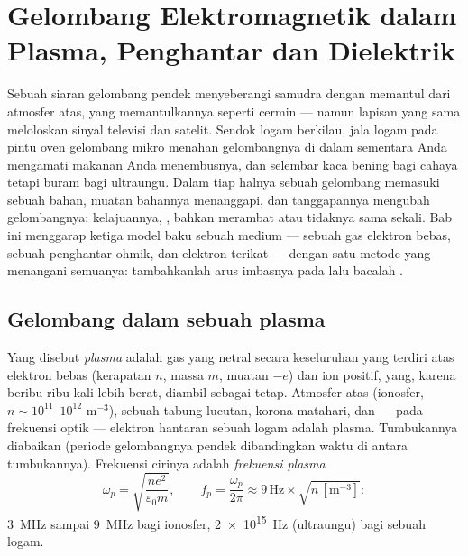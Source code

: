 \chapter{Gelombang Elektromagnetik dalam Plasma, Penghantar dan Dielektrik}\label{ch:b2:waves-in-media}

Sebuah siaran gelombang pendek menyeberangi samudra dengan memantul dari
atmosfer atas, yang memantulkannya seperti cermin --- namun lapisan yang sama
meloloskan sinyal televisi dan satelit. Sendok logam berkilau, jala
logam pada pintu oven gelombang mikro menahan gelombangnya di dalam sementara
Anda mengamati makanan Anda menembusnya, dan selembar kaca bening
bagi cahaya tetapi buram bagi ultraungu. Dalam tiap halnya sebuah gelombang memasuki
sebuah bahan, muatan bahannya menanggapi, dan tanggapannya mengubah
gelombangnya: kelajuannya, , bahkan merambat atau tidaknya
sama sekali. Bab ini menggarap ketiga model baku sebuah medium --- sebuah
gas elektron bebas, sebuah penghantar ohmik, dan elektron terikat --- dengan
satu metode yang menangani semuanya: tambahkanlah arus imbasnya pada
 lalu bacalah .

\section{Gelombang dalam sebuah plasma}

\begin{definition}\label{def:b2:waves-in-media:plasma}
Yang disebut \emph{plasma} adalah gas yang netral secara keseluruhan yang terdiri atas elektron bebas (kerapatan
$n$, massa $m$, muatan $-e$) dan ion positif, yang, karena beribu-ribu
kali lebih berat, diambil sebagai tetap. Atmosfer atas (ionosfer,
$n \sim 10^{11}$--$10^{12}$ m$^{-3}$), sebuah tabung lucutan, korona matahari,
dan --- pada frekuensi optik --- elektron hantaran sebuah logam
adalah plasma. Tumbukannya diabaikan (periode gelombangnya pendek
dibandingkan waktu di antara tumbukannya). Frekuensi cirinya
adalah \emph{frekuensi plasma}
\[
\omega_p = \sqrt{\frac{ne^2}{\varepsilon_0m}} , \qquad
f_p = \frac{\omega_p}{2\pi} \approx 9\,\text{Hz}\times\sqrt{n\,[\text{m}^{-3}]} :
\]
\qty{3}{MHz} sampai \qty{9}{MHz} bagi ionosfer, \qty{2e15}{Hz} (ultraungu) bagi
sebuah logam.
\end{definition}

